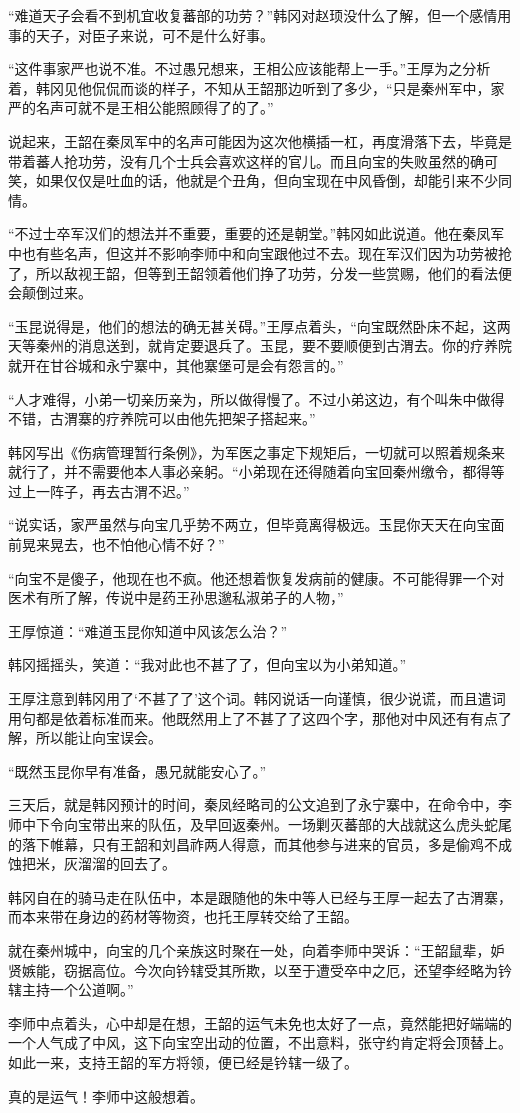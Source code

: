 “难道天子会看不到机宜收复蕃部的功劳？”韩冈对赵顼没什么了解，但一个感情用事的天子，对臣子来说，可不是什么好事。

“这件事家严也说不准。不过愚兄想来，王相公应该能帮上一手。”王厚为之分析着，韩冈见他侃侃而谈的样子，不知从王韶那边听到了多少，“只是秦州军中，家严的名声可就不是王相公能照顾得了的了。”

说起来，王韶在秦凤军中的名声可能因为这次他横插一杠，再度滑落下去，毕竟是带着蕃人抢功劳，没有几个士兵会喜欢这样的官儿。而且向宝的失败虽然的确可笑，如果仅仅是吐血的话，他就是个丑角，但向宝现在中风昏倒，却能引来不少同情。

“不过士卒军汉们的想法并不重要，重要的还是朝堂。”韩冈如此说道。他在秦凤军中也有些名声，但这并不影响李师中和向宝跟他过不去。现在军汉们因为功劳被抢了，所以敌视王韶，但等到王韶领着他们挣了功劳，分发一些赏赐，他们的看法便会颠倒过来。

“玉昆说得是，他们的想法的确无甚关碍。”王厚点着头，“向宝既然卧床不起，这两天等秦州的消息送到，就肯定要退兵了。玉昆，要不要顺便到古渭去。你的疗养院就开在甘谷城和永宁寨中，其他寨堡可是会有怨言的。”

“人才难得，小弟一切亲历亲为，所以做得慢了。不过小弟这边，有个叫朱中做得不错，古渭寨的疗养院可以由他先把架子搭起来。”

韩冈写出《伤病管理暂行条例》，为军医之事定下规矩后，一切就可以照着规条来就行了，并不需要他本人事必亲躬。“小弟现在还得随着向宝回秦州缴令，都得等过上一阵子，再去古渭不迟。”

“说实话，家严虽然与向宝几乎势不两立，但毕竟离得极远。玉昆你天天在向宝面前晃来晃去，也不怕他心情不好？”

“向宝不是傻子，他现在也不疯。他还想着恢复发病前的健康。不可能得罪一个对医术有所了解，传说中是药王孙思邈私淑弟子的人物，”

王厚惊道：“难道玉昆你知道中风该怎么治？”

韩冈摇摇头，笑道：“我对此也不甚了了，但向宝以为小弟知道。”

王厚注意到韩冈用了‘不甚了了’这个词。韩冈说话一向谨慎，很少说谎，而且遣词用句都是依着标准而来。他既然用上了不甚了了这四个字，那他对中风还有有点了解，所以能让向宝误会。

“既然玉昆你早有准备，愚兄就能安心了。”

三天后，就是韩冈预计的时间，秦凤经略司的公文追到了永宁寨中，在命令中，李师中下令向宝带出来的队伍，及早回返秦州。一场剿灭蕃部的大战就这么虎头蛇尾的落下帷幕，只有王韶和刘昌祚两人得意，而其他参与进来的官员，多是偷鸡不成蚀把米，灰溜溜的回去了。

韩冈自在的骑马走在队伍中，本是跟随他的朱中等人已经与王厚一起去了古渭寨，而本来带在身边的药材等物资，也托王厚转交给了王韶。

就在秦州城中，向宝的几个亲族这时聚在一处，向着李师中哭诉：“王韶鼠辈，妒贤嫉能，窃据高位。今次向钤辖受其所欺，以至于遭受卒中之厄，还望李经略为钤辖主持一个公道啊。”

李师中点着头，心中却是在想，王韶的运气未免也太好了一点，竟然能把好端端的一个人气成了中风，这下向宝空出动的位置，不出意料，张守约肯定将会顶替上。如此一来，支持王韶的军方将领，便已经是钤辖一级了。

真的是运气！李师中这般想着。

